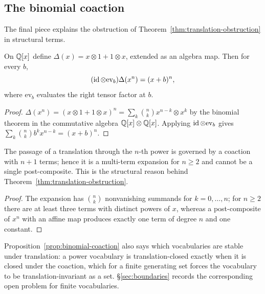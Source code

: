 \subsection{The binomial coaction}

The final piece explains the obstruction of Theorem~\ref{thm:translation-obstruction}
in structural terms.

\begin{proposition}\label{prop:binomial-coaction}
On $\mathbb{Q}[x]$ define $\Delta(x)=x\otimes 1+1\otimes x$, extended as an algebra map.  Then
for every $b$,
\[
  (\operatorname{id}\otimes \mathrm{ev}_b)\Delta(x^{n})=(x+b)^{n},
\]
where $\mathrm{ev}_b$ evaluates the right tensor factor at $b$.
\end{proposition}

\begin{proof}
$\Delta(x^{n})=(x\otimes1+1\otimes x)^{n}=\sum_{k}\binom{n}{k}x^{n-k}\otimes x^{k}$ by
the binomial theorem in the commutative algebra $\mathbb{Q}[x]\otimes\mathbb{Q}[x]$.  Applying
$\operatorname{id}\otimes\mathrm{ev}_b$ gives $\sum_k\binom{n}{k}b^{k}x^{n-k}=(x+b)^{n}$.
\end{proof}

\begin{corollary}\label{cor:translation-expands}
The passage of a translation through the $n$-th power is governed by a coaction with
$n+1$ terms; hence it is a multi-term expansion for $n\ge 2$ and cannot be a single
post-composite.  This is the structural reason behind
Theorem~\ref{thm:translation-obstruction}.
\end{corollary}

\begin{proof}
The expansion has $\binom{n}{k}$ nonvanishing summands for $k=0,\dots,n$; for $n\ge2$
there are at least three terms with distinct powers of $x$, whereas a post-composite of
$x^{n}$ with an affine map produces exactly one term of degree $n$ and one constant.
\end{proof}

\begin{remark}
Proposition~\ref{prop:binomial-coaction} also says which vocabularies are stable under
translation: a power vocabulary is translation-closed exactly when it is closed under
the coaction, which for a finite generating set forces the vocabulary to be
translation-invariant as a set.  \S\ref{sec:boundaries} records the corresponding open
problem for finite vocabularies.
\end{remark}

